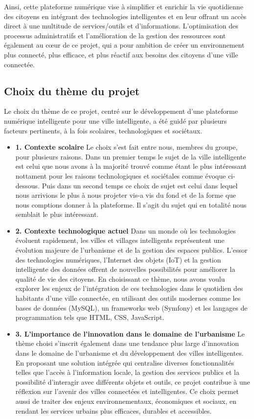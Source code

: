 \documentclass[a4paper,12pt]{report}
\begin{document}
	Ainsi, cette plateforme numérique vise à simplifier et enrichir la vie quotidienne des citoyens en intégrant des technologies intelligentes et en leur offrant un accès direct à une multitude de services/outils et d'informations. L’optimisation des processus administratifs et l'amélioration de la gestion des ressources sont également au cœur de ce projet, qui a pour ambition de créer un environnement plus connecté, plus efficace, et plus réactif aux besoins des citoyens d'une ville connectée.
	
	\subsection{Choix du thème du projet}
	
	Le choix du thème de ce projet, centré sur le développement d'une plateforme numérique intelligente pour une ville intelligente, a été guidé par plusieurs facteurs pertinents, à la fois scolaires, technologiques et sociétaux.
	
	\begin{itemize}
		\item \textbf{1. Contexte scolaire} Le choix s'est fait entre nous, membres du groupe, pour plusieurs raisons. Dans un premier temps le sujet de la ville intelligente est celui que nous avons à la majorité trouvé comme étant le plus intéressant nottament pour les raisons technologiques et sociétales comme évoque ci-dessous. Puis dans un second temps ce choix de sujet est celui dans lequel nous arrivions le plus à nous projeter vis-a vis du fond et de la forme que nous comptions donner à la plateforme. Il s'agit du sujet qui en totalité nous semblait le plus intéressant.
		\item \textbf{2. Contexte technologique actuel} Dans un monde où les technologies évoluent rapidement, les villes et villages intelligents représentent une évolution majeure de l'urbanisme et de la gestion des espaces publics. L'essor des technologies numériques, l'Internet des objets (IoT) et la gestion intelligente des données offrent de nouvelles possibilités pour améliorer la qualité de vie des citoyens. En choisissant ce thème, nous avons voulu explorer les enjeux de l'intégration de ces technologies dans le quotidien des habitants d'une ville connectée, en utilisant des outils modernes comme les bases de données (MySQL), un frameworks web (Symfony) et les langages de programmation tels que HTML, CSS, JavaScript.
		\item \textbf{3. L'importance de l'innovation dans le domaine de l'urbanisme} 	Le thème choisi s'inscrit également dans une tendance plus large d'innovation dans le domaine de l'urbanisme et du développement des villes intelligentes. En proposant une solution intégrée qui centralise diverses fonctionnalités telles que l'accès à l'information locale, la gestion des services publics et la possibilité d'interagir avec différents objets et outils, ce projet contribue à une réflexion sur l'avenir des villes connectées et intelligentes. Ce choix permet aussi de traiter des enjeux environnementaux, économiques et sociaux, en rendant les services urbains plus efficaces, durables et accessibles.
	\end{itemize}	
	
\end{document}

